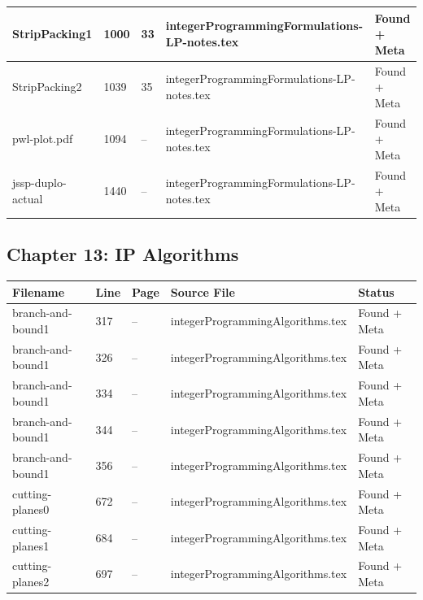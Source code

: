 \documentclass[11pt]{article}
\begin{document}
\begin{longtable}{|p{3.5cm}|p{1.5cm}|p{1cm}|p{4cm}|p{2cm}|}
StripPacking1 & 1000 & 33 & integerProgrammingFormulations-LP-notes.tex & \textcolor{found}{Found + Meta} \\
\hline

StripPacking2 & 1039 & 35 & integerProgrammingFormulations-LP-notes.tex & \textcolor{found}{Found + Meta} \\
\hline

pwl-plot.pdf & 1094 & -- & integerProgrammingFormulations-LP-notes.tex & \textcolor{found}{Found + Meta} \\
\hline

jssp-duplo-actual & 1440 & -- & integerProgrammingFormulations-LP-notes.tex & \textcolor{found}{Found + Meta} \\
\hline

\end{longtable}


\subsection{Chapter 13: IP Algorithms}



\begin{longtable}{|p{3.5cm}|p{1.5cm}|p{1cm}|p{4cm}|p{2cm}|}
\hline
\textbf{Filename} & \textbf{Line} & \textbf{Page} & \textbf{Source File} & \textbf{Status} \\
\hline
\endhead

branch-and-bound1 & 317 & -- & integerProgrammingAlgorithms.tex & \textcolor{found}{Found + Meta} \\
\hline

branch-and-bound1 & 326 & -- & integerProgrammingAlgorithms.tex & \textcolor{found}{Found + Meta} \\
\hline

branch-and-bound1 & 334 & -- & integerProgrammingAlgorithms.tex & \textcolor{found}{Found + Meta} \\
\hline

branch-and-bound1 & 344 & -- & integerProgrammingAlgorithms.tex & \textcolor{found}{Found + Meta} \\
\hline

branch-and-bound1 & 356 & -- & integerProgrammingAlgorithms.tex & \textcolor{found}{Found + Meta} \\
\hline

cutting-planes0 & 672 & -- & integerProgrammingAlgorithms.tex & \textcolor{found}{Found + Meta} \\
\hline

cutting-planes1 & 684 & -- & integerProgrammingAlgorithms.tex & \textcolor{found}{Found + Meta} \\
\hline

cutting-planes2 & 697 & -- & integerProgrammingAlgorithms.tex & \textcolor{found}{Found + Meta} \\
\hline

\end{longtable}
\end{document}

